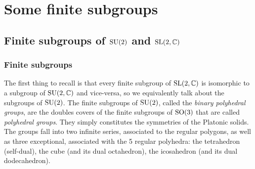 \section{Some finite subgroups}

    \subsection{Finite subgroups of $\text{SU}(2)$ and $\text{SL}(2,\mathbb{C})$}\label{app:su2subgroups}

        \subsubsection{Finite subgroups}

            The first thing to recall is that every finite subgroup of $\text{SL}(2,\mathbb{C})$ is isomorphic to a subgroup of $\text{SU}(2,\mathbb{C})$ and vice-versa, so we equivalently talk about the subgroups of $\text{SU}(2)$. The finite subgroups of $\text{SU}(2)$, called the \emph{binary polyhedral groups}, are the doubles covers of the finite subgroups of $\text{SO}(3)$ that are called \emph{polyhedral groups}. They simply constitutes the symmetries of the Platonic solids. The groups fall into two infinite series, associated to the regular polygons, as well as three exceptional, associated with the 5 regular polyhedra: the tetrahedron (self-dual), the cube (and its dual octahedron), the icosahedron (and its dual dodecahedron).

